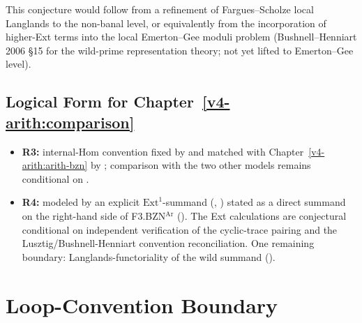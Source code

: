 This conjecture would follow from a refinement of Fargues--Scholze
local Langlands to the non-banal level, or equivalently from the
incorporation of higher-Ext terms into the local Emerton--Gee
moduli problem
(Bushnell--Henniart 2006 \S 15 for the wild-prime representation
theory; not yet lifted to Emerton--Gee level).

\subsection{Logical Form for Chapter~\ref{v4-arith:comparison}}

\begin{itemize}
\item \textbf{R3:} internal-Hom convention fixed by
 and matched with
Chapter~\ref{v4-arith:arith-bzn} by
; comparison with
the two other models remains conditional on
.
\item \textbf{R4:} modeled by an explicit
\(\mathrm{Ext}^{1}\)-summand
(,
) stated as a
direct summand on the right-hand side of F3.BZN\({}^{\mathrm{Ar}}\)
(). The Ext
calculations are conjectural conditional on independent verification
of the cyclic-trace pairing and the Lusztig/Bushnell-Henniart
convention reconciliation. One
remaining boundary: Langlands-functoriality of the wild summand
().
\end{itemize}

\section{Loop-Convention Boundary}
\label{v4-arith:bzn-rcompletion:summary}

